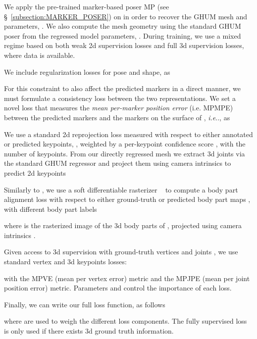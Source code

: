 \documentclass[10pt,twocolumn,letterpaper]{article}
\makeatletter
\DeclareRobustCommand\onedot{\futurelet\@let@token\@onedot}
\def\@onedot{\ifx\@let@token.\else.\null\fi\xspace}
\def\ie{\emph{i.e}\onedot} \def\Ie{\emph{I.e}\onedot}
\makeatother
\begin{document}
We apply the pre-trained marker-based poser MP (see \S~\ref{subsection:MARKER_POSER}) on  in order to recover the GHUM mesh and parameters, . We also compute the mesh geometry using the standard GHUM poser from the regressed model parameters, . During training, we use a mixed regime based on both weak 2d supervision losses and full 3d supervision losses, where data is available.

We include regularization losses for pose and shape, as


For this constraint to also affect the predicted markers  in a direct manner, we must formulate a consistency loss between the two representations. We set a novel loss that measures the \textit{mean per-marker position error} (i.e. MPMPE) between the predicted markers and the markers on the surface of , \ie , as


We use a standard 2d reprojection loss measured with respect to either annotated or predicted keypoints, , weighted by a per-keypoint confidence score , with  the number of keypoints. From our directly regressed mesh  we extract 3d joints  via the standard GHUM regressor and project them using camera intrinsics  to predict 2d keypoints


Similarly to \cite{zanfir2020neural}, we use a soft differentiable rasterizer ~\cite{liu2019soft} to compute a body part alignment loss with respect to either ground-truth or predicted body part maps , with  different body part labels


\noindent where  is the rasterized image of the 3d body parts of , projected using camera intrinsics .

Given access to 3d supervision with ground-truth vertices  and joints , we use standard vertex and 3d keypoints losses:

with  the MPVE (mean per vertex error) metric and  the MPJPE (mean per joint position error) metric. Parameters  and  control the importance of each loss.

Finally, we can write our full loss function, as follows

where  are used to weigh the different loss components. The fully supervised loss  is only used if there exists 3d ground truth information.
    
\end{document}
